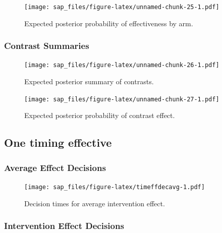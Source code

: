 \documentclass[
  bibliography=totoc]{scrreprt}
\begin{document}
\begin{figure}
\centering
\texttt{[image: sap\_files/figure-latex/unnamed-chunk-25-1.pdf]}
\caption{\label{fig:unnamed-chunk-25}Expected posterior probability of effectiveness by arm.}
\end{figure}

\clearpage

\hypertarget{contrast-summaries-1}{%
\subsubsection{Contrast Summaries}\label{contrast-summaries-1}}

\begin{figure}
\centering
\texttt{[image: sap\_files/figure-latex/unnamed-chunk-26-1.pdf]}
\caption{\label{fig:unnamed-chunk-26}Expected posterior summary of contrasts.}
\end{figure}

\begin{figure}
\centering
\texttt{[image: sap\_files/figure-latex/unnamed-chunk-27-1.pdf]}
\caption{\label{fig:unnamed-chunk-27}Expected posterior probability of contrast effect.}
\end{figure}

\clearpage

\hypertarget{one-timing-effective}{%
\subsection{One timing effective}\label{one-timing-effective}}

\hypertarget{average-effect-decisions-2}{%
\subsubsection{Average Effect Decisions}\label{average-effect-decisions-2}}

\begin{figure}
\centering
\texttt{[image: sap\_files/figure-latex/timeffdecavg-1.pdf]}
\caption{\label{fig:timeffdecavg}Decision times for average intervention effect.}
\end{figure}

\clearpage

\hypertarget{intervention-effect-decisions-2}{%
\subsubsection{Intervention Effect Decisions}\label{intervention-effect-decisions-2}}
\end{document}
